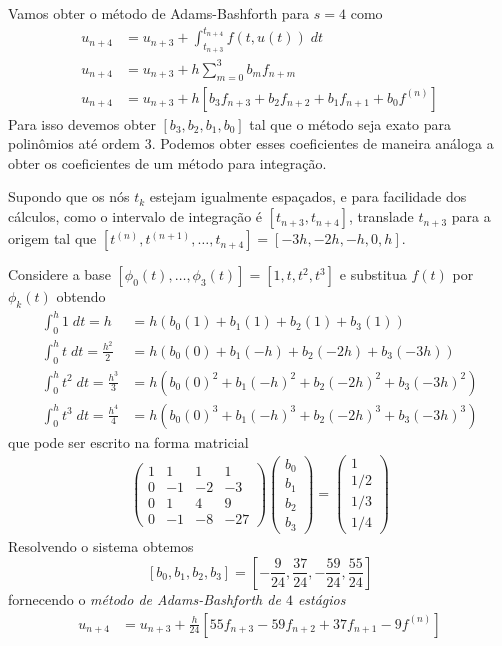 \begin{ex}
Vamos obter o método de Adams-Bashforth para $s=4$ como
\begin{eqnarray}
  u_{n+4}  &= u_{n+3}  + \int _{t_{n+3}}^{t_{n+4}} f(t,u(t)) \; dt \\
  u_{n+4}  &= u_{n+3}  + h \sum_{m=0}^{3} b_m f_{n+m} \\
  u_{n+4}  &= u_{n+3}  + h [b_3f_{n+3} +b_2f_{n+2} +b_1f_{n+1} +b_0f^{(n)}]
\end{eqnarray}
Para isso devemos obter $[b_3,b_2,b_1,b_0]$ tal que o método seja exato para polinômios até ordem $3$. Podemos obter esses coeficientes de maneira análoga a obter os coeficientes de um método para integração.

Supondo que os nós $t_k$ estejam igualmente espaçados, e para facilidade dos cálculos, como o intervalo de integração é $[t_{n+3},t_{n+4}]$, translade $t_{n+3}$ para a origem tal que $[t^{(n)},t^{(n+1)},\ldots ,t_{n+4}]=[-3h,-2h,-h,0,h]$.

Considere a base $[\phi _0(t),\ldots ,\phi _3(t)]=[1, t, t^2, t^3]$ e substitua $f(t)$ por $\phi _k(t)$ obtendo
\begin{eqnarray*}
  \int _0^{h} 1  \;dt = h             &= h( b_0(1)  +b_1(1)    + b_2(1)   + b_3(1)    )\\
  \int _0^{h} t  \;dt = \frac{h^2}{2}  &= h( b_0(0)  +b_1(-h)   + b_2(-2h) + b_3(-3h)  )\\
  \int _0^{h} t^2 \;dt = \frac{h^3}{3}  &= h( b_0(0)^2 +b_1(-h)^2  + b_2(-2h)^2+ b_3(-3h)^2 )\\
  \int _0^{h} t^3 \;dt = \frac{h^4}{4} &= h( b_0(0)^3 +b_1(-h)^3  + b_2(-2h)^3+ b_3(-3h)^3 )
\end{eqnarray*}
que pode ser escrito na forma matricial
\begin{eqnarray}
\left(
  \begin{array}{cccc}
    1  &  1    & 1   & 1\\
    0  &  -1   & -2  & -3\\
    0  &  1    & 4   &  9\\
    0  &  -1   & -8  & -27
  \end{array}
\right)
\left(\begin{array}{c}  b_0 \\ b_1\\ b_2\\b_3   \end{array}\right)
=
\left(\begin{array}{c}  1  \\ 1/2 \\ 1/3 \\ 1/4  \end{array}\right)
\end{eqnarray}
Resolvendo o sistema obtemos
$$[b_0,b_1,b_2,b_3]=[-\frac{9}{24},\frac{37}{24},-\frac{59}{24},\frac{55}{24}]$$
fornecendo o \emph{método de Adams-Bashforth de $4$ estágios}
\begin{eqnarray}\label{AB4}
  u_{n+4}  &= u_{n+3}  + \frac{h}{24} [55 f_{n+3} -59f_{n+2} +37f_{n+1} -9f^{(n)}]
\end{eqnarray}
\end{ex}

